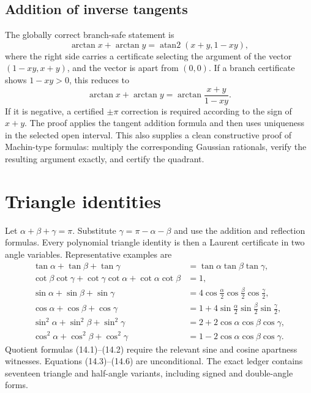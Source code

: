 \documentclass[11pt]{article}
\theoremstyle{definition}
\newcommand{\atanTwo}{\operatorname{atan2}}
\begin{document}
\subsection{Addition of inverse tangents}

The globally correct branch-safe statement is
\[
 \arctan x+\arctan y
 =\atanTwo(x+y,1-xy),
 \tag{13.4}
\]
where the right side carries a certificate selecting the argument of the vector
\((1-xy,x+y)\), and the vector is apart from \((0,0)\).  If a branch certificate
shows \(1-xy>0\), this reduces to
\[
 \arctan x+\arctan y
 =\arctan\frac{x+y}{1-xy}.
 \tag{13.5}
\]
If it is negative, a certified \(\pm\pi\) correction is required according to
the sign of \(x+y\).  The proof applies the tangent addition formula and then
uses uniqueness in the selected open interval.  This also supplies a clean
constructive proof of Machin-type formulas: multiply the corresponding Gaussian
rationals, verify the resulting argument exactly, and certify the quadrant.

\section{Triangle identities}
\label{sec:triangles}

Let \(\alpha+\beta+\gamma=\pi\).  Substitute
\(\gamma=\pi-\alpha-\beta\) and use the addition and reflection formulas.
Every polynomial triangle identity is then a Laurent certificate in two angle
variables.  Representative examples are
\begin{align}
 \tan\alpha+\tan\beta+\tan\gamma
 &=\tan\alpha\tan\beta\tan\gamma,\tag{14.1}\\
 \cot\beta\cot\gamma+\cot\gamma\cot\alpha+
 \cot\alpha\cot\beta&=1,\tag{14.2}\\
 \sin\alpha+\sin\beta+\sin\gamma
 &=4\cos\frac\alpha2\cos\frac\beta2\cos\frac\gamma2,\tag{14.3}\\
 \cos\alpha+\cos\beta+\cos\gamma
 &=1+4\sin\frac\alpha2\sin\frac\beta2\sin\frac\gamma2,\tag{14.4}\\
 \sin^2\alpha+\sin^2\beta+\sin^2\gamma
 &=2+2\cos\alpha\cos\beta\cos\gamma,\tag{14.5}\\
 \cos^2\alpha+\cos^2\beta+\cos^2\gamma
 &=1-2\cos\alpha\cos\beta\cos\gamma.\tag{14.6}
\end{align}
Quotient formulas (14.1)--(14.2) require the relevant sine and cosine
apartness witnesses.  Equations (14.3)--(14.6) are unconditional.  The exact
ledger contains seventeen triangle and half-angle variants, including signed
and double-angle forms.
\end{document}
